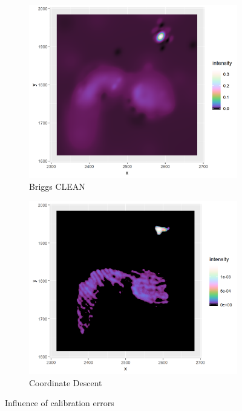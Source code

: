 \begin{figure}[h]
	\centering
	\begin{subfigure}[b]{0.4\linewidth}
		\includegraphics[width=1.00\linewidth]{./chapters/10.results/MSClean/Briggs-Calibration.png}
		\caption{Briggs CLEAN}
	\end{subfigure}
	\begin{subfigure}[b]{0.4\linewidth}
		\includegraphics[width=1.00\linewidth]{./chapters/10.results/SerialCD/CD-Calibration.png}
		\caption{Coordinate Descent}
	\end{subfigure}
	\caption{Influence of calibration errors}
	\label{results:cleancomp::calib:figure}
\end{figure}


